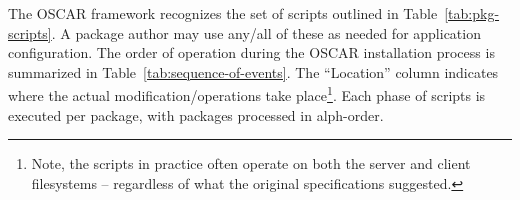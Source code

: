 The OSCAR framework recognizes the set of scripts outlined in
Table~\ref{tab:pkg-scripts}.  A package author may use any/all of these as
needed for application configuration.  The order of operation during the
OSCAR installation process is summarized in
Table~\ref{tab:sequence-of-events}.  The ``Location'' column indicates
where the actual modification/operations take place\footnote{Note, the
 scripts in practice often operate on both the server
and client filesystems -- regardless of what the original specifications
suggested.}.  Each phase of scripts is executed per package, with packages 
processed in alph-order. 





